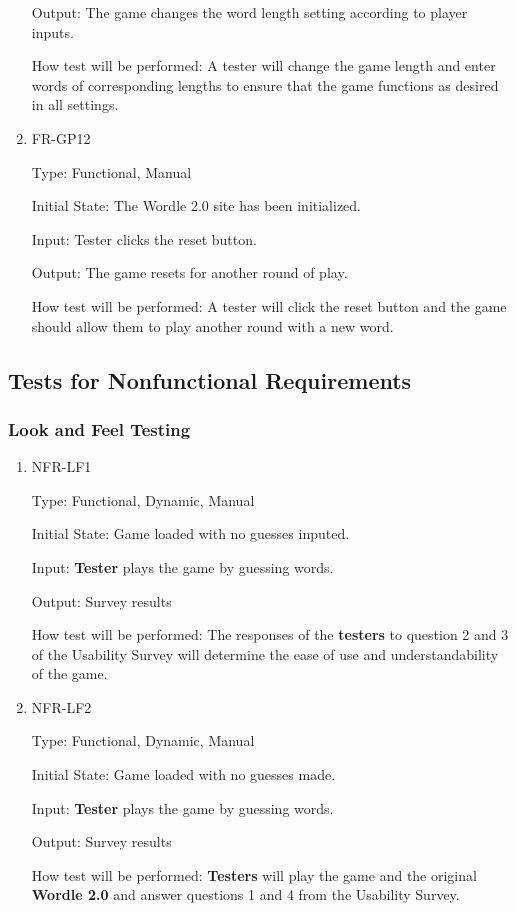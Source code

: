 \documentclass[12pt, titlepage]{article}
\begin{document}
\begin{enumerate}
Output: The game changes the word length setting according to player inputs.

How test will be performed: A tester will change the game length and enter 
words of corresponding lengths to ensure that the game functions as desired in 
all settings.

\item{FR-GP12\\}

Type: Functional, Manual

Initial State: The Wordle 2.0 site has been initialized.

Input: Tester clicks the reset button.

Output: The game resets for another round of play.

How test will be performed: A tester will click the reset button and the game 
should allow them to play another round with a new word.

\end{enumerate}



\subsection{Tests for Nonfunctional Requirements}

\subsubsection{Look and Feel Testing}

\begin{enumerate}

\item{NFR-LF1\\}

Type: Functional, Dynamic, Manual
					
Initial State: Game loaded with no guesses inputed. 
					
Input: \textbf{Tester} plays the game by guessing words.
					
Output: Survey results
					
How test will be performed: The responses of the \textbf{testers} 
to question 2 and 3 of the Usability Survey will determine the 
ease of use and understandability of the game. 

					
\item{NFR-LF2\\}

Type: Functional, Dynamic, Manual
					
Initial State: Game loaded with no guesses made. 
					
Input: \textbf{Tester} plays the game by guessing words.
					
Output: Survey results
					
How test will be performed: \textbf{Testers} will play the 
game and the original \textbf{Wordle 2.0} and answer questions 1 and 4 from the 
Usability Survey.

\end{enumerate}
\end{document}
